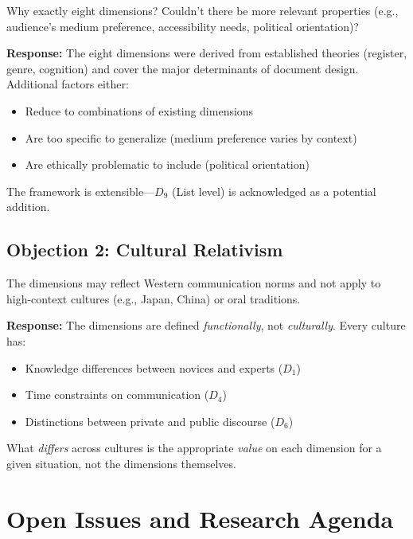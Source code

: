 \begin{tcolorbox}[colback=red!5!white, colframe=red!50!black,
    title=Objection: Eight dimensions are insufficient]
Why exactly eight dimensions? Couldn't there be more relevant properties
(e.g., audience's medium preference, accessibility needs, political orientation)?
\end{tcolorbox}

\textbf{Response:} The eight dimensions were derived from established theories
(register, genre, cognition) and cover the major determinants of document design.
Additional factors either:
\begin{itemize}[nosep]
\item Reduce to combinations of existing dimensions
\item Are too specific to generalize (medium preference varies by context)
\item Are ethically problematic to include (political orientation)
\end{itemize}
The framework is extensible---$D_9$ (List level) is acknowledged as a potential addition.

\subsection{Objection 2: Cultural Relativism}

\begin{tcolorbox}[colback=red!5!white, colframe=red!50!black,
    title=Objection: Dimensions are Western-centric]
The dimensions may reflect Western communication norms and not apply
to high-context cultures (e.g., Japan, China) or oral traditions.
\end{tcolorbox}

\textbf{Response:} The dimensions are defined \textit{functionally}, not \textit{culturally}.
Every culture has:
\begin{itemize}[nosep]
\item Knowledge differences between novices and experts ($D_1$)
\item Time constraints on communication ($D_4$)
\item Distinctions between private and public discourse ($D_6$)
\end{itemize}
What \textit{differs} across cultures is the appropriate \textit{value} on each dimension
for a given situation, not the dimensions themselves.


\section{Open Issues and Research Agenda}
\label{sec:doctype-theory-open}

